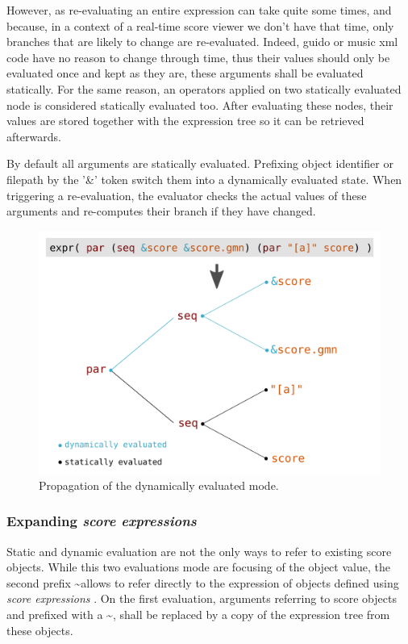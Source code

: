 \documentclass{article}
\newcommand{\sExpr}{\emph{score expressions} }
\newcommand{\lowTilde} 		{\textasciitilde}
\begin{document}
However, as re-evaluating an entire expression can take quite some times, and because, in a context of a real-time score viewer we don't have that time, only branches that are likely to change are re-evaluated. Indeed, guido or music xml code have no reason to change through time, thus their values should only be evaluated once and kept as they are, these arguments shall be evaluated statically. For the same reason, an operators applied on two statically evaluated node is considered statically evaluated too. After evaluating these nodes, their values are stored together with the expression tree so it can be retrieved afterwards.

By default all arguments are statically evaluated. Prefixing object identifier or filepath by the '\&' token switch them into a dynamically evaluated state. When triggering a re-evaluation, the evaluator checks the actual values of these arguments and re-computes their branch if they have changed.


\begin{figure}[th]
\centering
\includegraphics[width=1\columnwidth]{imgs/dynamicEval}
\caption{Propagation of the dynamically evaluated mode.
\label{fig:example}}
\end{figure}


\subsubsection{Expanding \sExpr}

Static and dynamic evaluation are not the only ways to refer to existing score objects. While this two evaluations mode are focusing of the object value, the second prefix \lowTilde allows to refer directly to the expression of objects defined using \sExpr. On the first evaluation, arguments referring to score objects and prefixed with a \lowTilde, shall be replaced by a copy of the expression tree from these objects.
\end{document}
